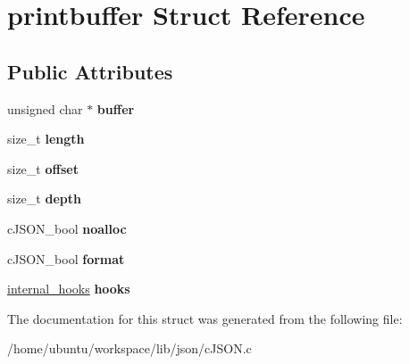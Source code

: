 \hypertarget{structprintbuffer}{\section{printbuffer Struct Reference}
\label{structprintbuffer}
}
\subsection*{Public Attributes}
\begin{DoxyCompactItemize}
\item 
\hypertarget{structprintbuffer_a754f63618e91db99f7ab6cfc4e629013}{unsigned char $\ast$ {\bfseries buffer}}\label{structprintbuffer_a754f63618e91db99f7ab6cfc4e629013}

\item 
\hypertarget{structprintbuffer_a1a679f8b6fe9b413fb3a87203b0f5bc8}{size\-\_\-t {\bfseries length}}\label{structprintbuffer_a1a679f8b6fe9b413fb3a87203b0f5bc8}

\item 
\hypertarget{structprintbuffer_a3ed6f9d24d6591047680492a962dc7c9}{size\-\_\-t {\bfseries offset}}\label{structprintbuffer_a3ed6f9d24d6591047680492a962dc7c9}

\item 
\hypertarget{structprintbuffer_aa7311b5da38ff8d1737824c611b48732}{size\-\_\-t {\bfseries depth}}\label{structprintbuffer_aa7311b5da38ff8d1737824c611b48732}

\item 
\hypertarget{structprintbuffer_aa2a7966b71dc3535e4e3789c33ec5368}{c\-J\-S\-O\-N\-\_\-bool {\bfseries noalloc}}\label{structprintbuffer_aa2a7966b71dc3535e4e3789c33ec5368}

\item 
\hypertarget{structprintbuffer_a75d3f480f5308e7f4afecf30e11277ef}{c\-J\-S\-O\-N\-\_\-bool {\bfseries format}}\label{structprintbuffer_a75d3f480f5308e7f4afecf30e11277ef}

\item 
\hypertarget{structprintbuffer_a43a8b3bcc644432f12f5aed5159d2520}{\hyperlink{structinternal__hooks}{internal\-\_\-hooks} {\bfseries hooks}}\label{structprintbuffer_a43a8b3bcc644432f12f5aed5159d2520}

\end{DoxyCompactItemize}


The documentation for this struct was generated from the following file\-:\begin{DoxyCompactItemize}
\item 
/home/ubuntu/workspace/lib/json/c\-J\-S\-O\-N.\-c\end{DoxyCompactItemize}
